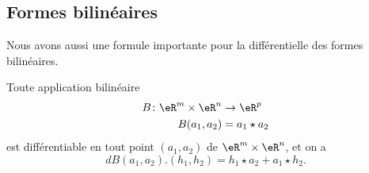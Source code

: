 \subsection{Formes bilinéaires}

Nous avons aussi une formule importante pour la différentielle des formes bilinéaires.
\begin{lemma}\label{bilin_diff}
	Toute application bilinéaire
	\begin{equation}
		\begin{aligned}
			B\colon \eR^m\times\eR^n & \to \eR^p      \\
			B(a_1,a_2)               & =a_1 \star a_2
		\end{aligned}
	\end{equation}
	est différentiable en tout point $(a_1,a_2)$ de $\eR^m\times\eR^n$, et on a
	\[
		dB(a_1,a_2).(h_1,h_2)=h_1\star a_2 + a_1\star h_2.
	\]
\end{lemma}
